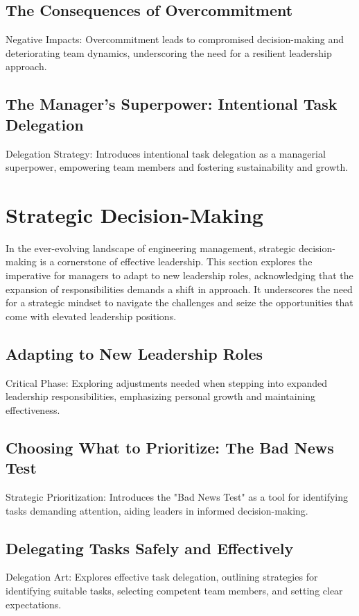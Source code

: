 \documentclass[10pt]{article}
\begin{document}
\subsection{The Consequences of Overcommitment}
Negative Impacts: Overcommitment leads to compromised decision-making and deteriorating team dynamics, underscoring the need for a resilient leadership approach.


\subsection{The Manager's Superpower: Intentional Task Delegation}
Delegation Strategy: Introduces intentional task delegation as a managerial superpower, empowering team members and fostering sustainability and growth.


\section{Strategic Decision-Making}
In the ever-evolving landscape of engineering management, strategic decision-making is a cornerstone of effective leadership. This section explores the imperative for managers to adapt to new leadership roles, acknowledging that the expansion of responsibilities demands a shift in approach. It underscores the need for a strategic mindset to navigate the challenges and seize
the opportunities that come with elevated leadership positions.

\subsection{Adapting to New Leadership Roles}
Critical Phase: Exploring adjustments needed when stepping into expanded leadership responsibilities, emphasizing personal growth and maintaining effectiveness.

\subsection{Choosing What to Prioritize: The Bad News Test}
Strategic Prioritization: Introduces the "Bad News Test" as a tool for identifying tasks demanding attention, aiding leaders in informed decision-making.

\subsection{Delegating Tasks Safely and Effectively}
Delegation Art: Explores effective task delegation, outlining strategies for identifying suitable tasks, selecting competent team members, and setting clear expectations.
\end{document}
